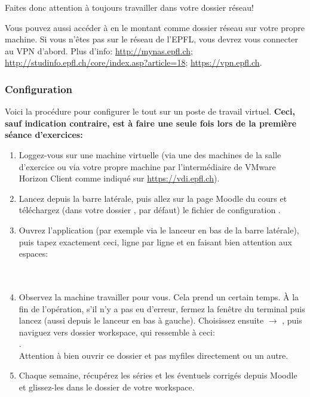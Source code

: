 \documentclass[10pt]{article}
\begin{document}
Faites donc attention à toujours travailler dans votre dossier réseau!

Vous pouvez aussi accéder à  en le montant comme dossier réseau sur votre propre machine. Si vous n'êtes pas sur le réseau de l'EPFL, vous devrez vous connecter au VPN d'abord. Plus d'info: \url{http://mynas.epfl.ch}; \url{http://studinfo.epfl.ch/core/index.asp?article=18}; \url{https://vpn.epfl.ch}.

\subsubsection*{Configuration}

Voici la procédure pour configurer le tout sur un poste de travail virtuel. \textbf{Ceci, sauf indication contraire, est à faire une seule fois lors de la première séance d'exercices:}
\begin{enumerate}
\item Loggez-vous sur une machine virtuelle (via une des machines de la salle d'exercice ou via votre propre machine par l'intermédiaire de VMware Horizon Client comme indiqué sur \url{https://vdi.epfl.ch}).
\item Lancez  depuis la barre latérale, puis allez sur la page Moodle du cours et téléchargez (dans votre dossier , par défaut) le fichier de configuration .
\item Ouvrez l'application  (par exemple via le lanceur en bas de la barre latérale), puis tapez exactement ceci, ligne par ligne et en faisant bien attention aux espaces:\\
\\
\\
\item Observez la machine travailler pour vous. Cela prend un certain temps. À la fin de l'opération, s'il n'y a pas eu d'erreur, fermez la fenêtre du terminal puis lancez  (aussi depuis le lanceur en bas à gauche). Choisissez ensuite  $\rightarrow$ , puis naviguez vers dossier workspace, qui ressemble à ceci:\\
.\\
Attention à bien ouvrir ce dossier et pas myfiles directement ou un autre.
\item Chaque semaine, récupérez les séries et les éventuels corrigés depuis Moodle et glissez-les dans le dossier de votre workspace.
\end{enumerate}
\end{document}

